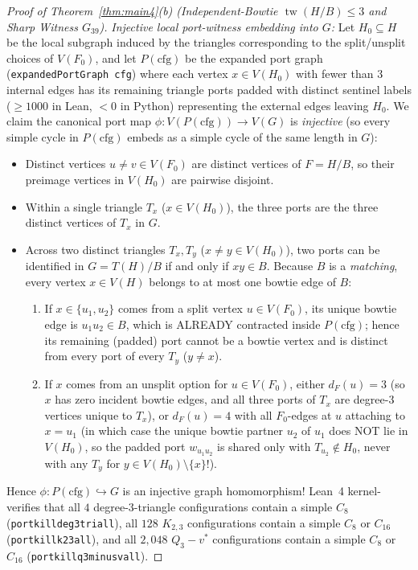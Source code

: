 \documentclass[11pt,reqno]{amsart}
\theoremstyle{plain}
\theoremstyle{definition}
\theoremstyle{remark}
\newcommand{\tw}{\operatorname{tw}}
\DeclareRobustCommand{\_}{\ifmmode\text{\textunderscore}\else\textunderscore\allowbreak\fi}
\begin{document}
\begin{proof}[Proof of Theorem~\ref{thm:main4}(b) (Independent-Bowtie $\tw(H/B) \le 3$ and Sharp Witness $G_{39}$)]
\emph{Injective local port-witness embedding into $G$:} Let $H_0 \subseteq H$ be the local subgraph induced by the triangles corresponding to the split/unsplit choices of $V(F_0)$, and let $P(\mathrm{cfg})$ be the expanded port graph (\texttt{expandedPortGraph cfg}) where each vertex $x \in V(H_0)$ with fewer than $3$ internal edges has its remaining triangle ports padded with distinct sentinel labels ($\ge 1000$ in Lean, $< 0$ in Python) representing the external edges leaving $H_0$. We claim the canonical port map $\phi : V(P(\mathrm{cfg})) \to V(G)$ is \emph{injective} (so every simple cycle in $P(\mathrm{cfg})$ embeds as a simple cycle of the same length in $G$):
\begin{itemize}[leftmargin=1.6em]
  \item Distinct vertices $u \neq v \in V(F_0)$ are distinct vertices of $F = H/B$, so their preimage vertices in $V(H_0)$ are pairwise disjoint.
  \item Within a single triangle $T_x$ ($x \in V(H_0)$), the three ports are the three distinct vertices of $T_x$ in $G$.
  \item Across two distinct triangles $T_x, T_y$ ($x \neq y \in V(H_0)$), two ports can be identified in $G = T(H)/B$ if and only if $xy \in B$. Because $B$ is a \emph{matching}, every vertex $x \in V(H)$ belongs to at most one bowtie edge of $B$:
  \begin{enumerate}[label=(\alph*),leftmargin=1.8em]
    \item If $x \in \{u_1, u_2\}$ comes from a split vertex $u \in V(F_0)$, its unique bowtie edge is $u_1 u_2 \in B$, which is ALREADY contracted inside $P(\mathrm{cfg})$; hence its remaining (padded) port cannot be a bowtie vertex and is distinct from every port of every $T_y$ ($y \neq x$).
    \item If $x$ comes from an unsplit option for $u \in V(F_0)$, either $d_F(u) = 3$ (so $x$ has zero incident bowtie edges, and all three ports of $T_x$ are degree-$3$ vertices unique to $T_x$), or $d_F(u) = 4$ with all $F_0$-edges at $u$ attaching to $x = u_1$ (in which case the unique bowtie partner $u_2$ of $u_1$ does NOT lie in $V(H_0)$, so the padded port $w_{u_1 u_2}$ is shared only with $T_{u_2} \notin H_0$, never with any $T_y$ for $y \in V(H_0) \setminus \{x\}$!).
  \end{enumerate}
\end{itemize}
Hence $\phi : P(\mathrm{cfg}) \hookrightarrow G$ is an injective graph homomorphism! Lean~4 kernel-verifies that all $4$ degree-$3$-triangle configurations contain a simple $C_8$ (\texttt{port\_kill\_deg3\_tri\_all\_4}), all $128$ $K_{2,3}$ configurations contain a simple $C_8$ or $C_{16}$ (\texttt{port\_kill\_k23\_all\_128}), and all $2{,}048$ $Q_3 - v^*$ configurations contain a simple $C_8$ or $C_{16}$ (\texttt{port\_kill\_q3\_minus\_v\_all\_2048}).


\end{proof}
\end{document}

